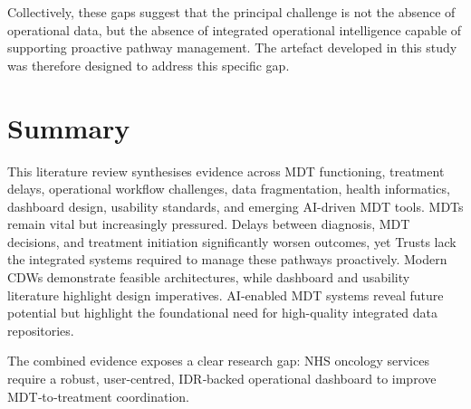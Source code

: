 Collectively, these gaps suggest that the principal challenge is not the absence of operational data, but the absence of integrated operational intelligence capable of supporting proactive pathway management. The artefact developed in this study was therefore designed to address this specific gap.

\section{Summary}

This literature review synthesises evidence across MDT functioning, treatment delays, operational workflow challenges, data fragmentation, health informatics, dashboard design, usability standards, and emerging AI-driven MDT tools. MDTs remain vital but increasingly pressured. Delays between diagnosis, MDT decisions, and treatment initiation significantly worsen outcomes, yet Trusts lack the integrated systems required to manage these pathways proactively. Modern CDWs demonstrate feasible architectures, while dashboard and usability literature highlight design imperatives. AI‑enabled MDT systems reveal future potential but highlight the foundational need for high-quality integrated data repositories.

The combined evidence exposes a clear research gap: NHS oncology services require a robust, user-centred, IDR‑backed operational dashboard to improve MDT‑to‑treatment coordination.
